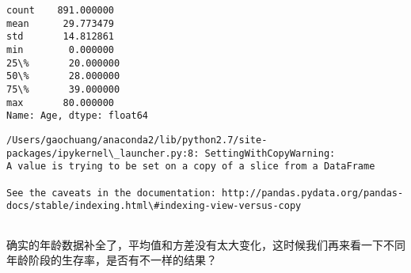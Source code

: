 \documentclass[11pt]{article}
\begin{document}
    \begin{Verbatim}[commandchars=\\\{\}]
count    891.000000
mean      29.773479
std       14.812861
min        0.000000
25\%       20.000000
50\%       28.000000
75\%       39.000000
max       80.000000
Name: Age, dtype: float64

    \end{Verbatim}

    \begin{Verbatim}[commandchars=\\\{\}]
/Users/gaochuang/anaconda2/lib/python2.7/site-packages/ipykernel\_launcher.py:8: SettingWithCopyWarning: 
A value is trying to be set on a copy of a slice from a DataFrame

See the caveats in the documentation: http://pandas.pydata.org/pandas-docs/stable/indexing.html\#indexing-view-versus-copy
  

    \end{Verbatim}

    确实的年龄数据补全了，平均值和方差没有太大变化，这时候我们再来看一下不同年龄阶段的生存率，是否有不一样的结果？
\end{document}
